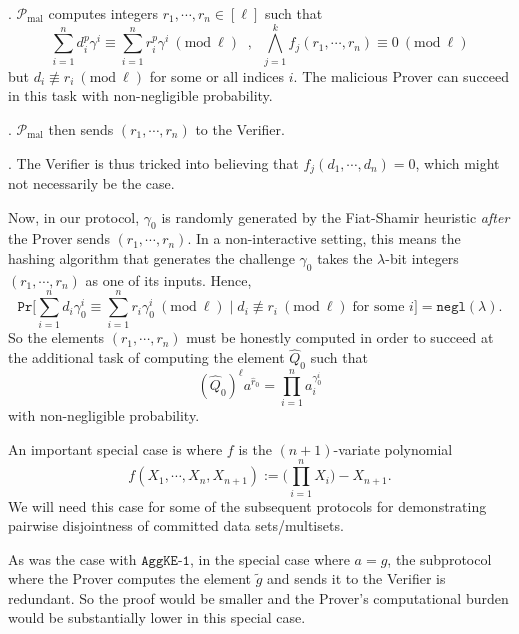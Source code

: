\documentclass[11pt, lettersize, notitlepage, leqno, footskip=0.6cm]{article}
\newcommand{\pl}{\prod\limits}
\newcommand{\slim}{\sum\limits}
\newcommand{\ttt}{\texttt}
\newcommand{\negl}{\ttt{{negl}}}
\newcommand{\wti}{\widetilde}
\newcommand{\mc}{\mathcal}
\newcommand{\mb}{\mathbb}
\newcommand{\mr}{\mathrm}
\newcommand{\lam}{\lambda}
\newcommand{\what}{\widehat}
\newcommand{\mP}{\mc{P}}
\newcommand{\vs}{\vspace{-0.15cm}}
\newcommand{\noin}{\noindent}
\newcommand{\Mod}[1]{\ (\mathrm{mod}\ #1)}
\numberwithin{equation}{section}
\begin{document}
\noin 1. $\mP_{\mr{mal}}$ computes integers $r_1,\cdots,r_n\in[\ell]$ such that \vs $$ \slim_{i=1}^n d_i^{p}\gamma^i\equiv\slim_{i=1}^n r_i^{p}\gamma^i\Mod{\ell} \;\;,\;\; \bigwedge\limits_{j=1}^k f_j(r_1,\cdots,r_n) \equiv 0\Mod{\ell}$$ but $d_i\not\equiv r_i\Mod{\ell}$ for some or all indices $i$. The malicious Prover can succeed in this task with non-negligible probability.

\noin 2. $\mP_{\mr{mal}}$ then sends $(r_1,\cdots,r_n)$ to the Verifier.

\noin 3. The Verifier is thus tricked into believing that $f_j(d_1,\cdots,d_n) = 0$, which might not necessarily be the case.

Now, in our protocol, $\gamma_{0}$ is randomly generated by the Fiat-Shamir heuristic \textit{after} the Prover sends $(r_1,\cdots,r_n)$. In a non-interactive setting, this means the hashing algorithm that generates the challenge $\gamma_{0}$ takes the $\lam$-bit integers $(r_1,\cdots,r_n)$ as one of its inputs. Hence, \vs $$\ttt{Pr}\Big[\slim_{i=1}^n d_i\gamma_{0}^i \equiv \slim_{i=1}^n r_i\gamma_{0}^i \Mod{\ell}\;\Big|\; d_i\not\equiv r_i\Mod{\ell}\;\text{for some } i\Big] = \negl(\lam). $$ So the elements $(r_1,\cdots,r_n)$ must be honestly computed in order to succeed at the additional task of computing the element $\what{Q}_0$ such that \vs $$(\what{Q}_0)^{\ell}a^{\what{r}_0} = \pl_{i=1}^{n} a_i^{\gamma_{0}^i} $$ with non-negligible probability.

\begin{comment} Although the proof is linear in size because of the $\lam$-bit integers $r_1,\cdots,r_n$, the number of $\mb{G}$-elements in this proof is constant. Since the group elements are much larger than $\lam$-bits, the communication complexity is substantially smaller that sending over $n$ separate arguments of knowledge. For instance, when $\lam = 128$, the group elements are of bit-size $3072$ with a RSA group, $6656$-bits with an imaginary quadratic class group and $3300$-bits with a Jacobian of a genus three hyperelliptic curve.\end{comment}

An important special case is where $f$ is the $(n+1)$-variate polynomial \vs $$f(X_1,\cdots,X_n, X_{n+1}) := \big(\pl_{i=1}^n X_i \big)- X_{n+1}.$$ We will need this case for some of the subsequent protocols for demonstrating pairwise disjointness of committed data sets/multisets.

As was the case with $\ttt{AggKE-1}$, in the special case where $a = g$, the subprotocol where the Prover computes the element $\wti{g}$ and sends it to the Verifier is redundant. So the proof would be smaller and the Prover's computational burden would be substantially lower in this special case.
\end{document}
